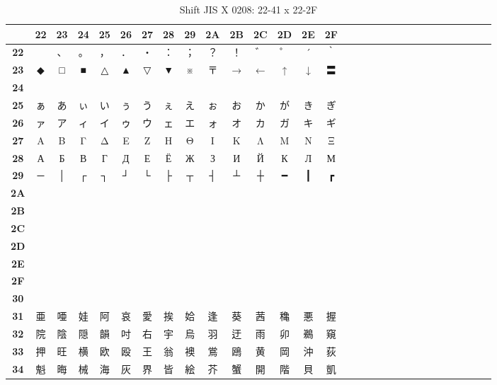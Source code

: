 \begin{table}[H]
\Fontified
\centering
\caption{Shift JIS X 0208: 22-41 x 22-2F}
\begin{tabular}{|Sc|Sc|Sc|Sc|Sc|Sc|Sc|Sc|Sc|Sc|Sc|Sc|Sc|Sc|Sc|}
\hline
 & \textbf{22} & \textbf{23} & \textbf{24} & \textbf{25} & \textbf{26} & \textbf{27} & \textbf{28} & \textbf{29} & \textbf{2A} & \textbf{2B} & \textbf{2C} & \textbf{2D} & \textbf{2E} & \textbf{2F} \\ \hline
\textbf{22} & 　 & 、 & 。 & ， & ． & ・ & ： & ； & ？ & ！ & ゛ & ゜ & ´ & ｀ \\ \hline
\textbf{23} & ◆ & □ & ■ & △ & ▲ & ▽ & ▼ & ※ & 〒 & → & ← & ↑ & ↓ & 〓 \\ \hline
\textbf{24} &  &  &  &  &  &  &  &  &  &  &  &  &  &  \\ \hline
\textbf{25} & ぁ & あ & ぃ & い & ぅ & う & ぇ & え & ぉ & お & か & が & き & ぎ \\ \hline
\textbf{26} & ァ & ア & ィ & イ & ゥ & ウ & ェ & エ & ォ & オ & カ & ガ & キ & ギ \\ \hline
\textbf{27} & Α & Β & Γ & Δ & Ε & Ζ & Η & Θ & Ι & Κ & Λ & Μ & Ν & Ξ \\ \hline
\textbf{28} & А & Б & В & Г & Д & Е & Ё & Ж & З & И & Й & К & Л & М \\ \hline
\textbf{29} & ─ & │ & ┌ & ┐ & ┘ & └ & ├ & ┬ & ┤ & ┴ & ┼ & ━ & ┃ & ┏ \\ \hline
\textbf{2A} &  &  &  &  &  &  &  &  &  &  &  &  &  &  \\ \hline
\textbf{2B} &  &  &  &  &  &  &  &  &  &  &  &  &  &  \\ \hline
\textbf{2C} &  &  &  &  &  &  &  &  &  &  &  &  &  &  \\ \hline
\textbf{2D} &  &  &  &  &  &  &  &  &  &  &  &  &  &  \\ \hline
\textbf{2E} &  &  &  &  &  &  &  &  &  &  &  &  &  &  \\ \hline
\textbf{2F} &  &  &  &  &  &  &  &  &  &  &  &  &  &  \\ \hline
\textbf{30} &  &  &  &  &  &  &  &  &  &  &  &  &  &  \\ \hline
\textbf{31} & 亜 & 唖 & 娃 & 阿 & 哀 & 愛 & 挨 & 姶 & 逢 & 葵 & 茜 & 穐 & 悪 & 握 \\ \hline
\textbf{32} & 院 & 陰 & 隠 & 韻 & 吋 & 右 & 宇 & 烏 & 羽 & 迂 & 雨 & 卯 & 鵜 & 窺 \\ \hline
\textbf{33} & 押 & 旺 & 横 & 欧 & 殴 & 王 & 翁 & 襖 & 鴬 & 鴎 & 黄 & 岡 & 沖 & 荻 \\ \hline
\textbf{34} & 魁 & 晦 & 械 & 海 & 灰 & 界 & 皆 & 絵 & 芥 & 蟹 & 開 & 階 & 貝 & 凱 \\ \hline

\end{tabular}
\end{table}
